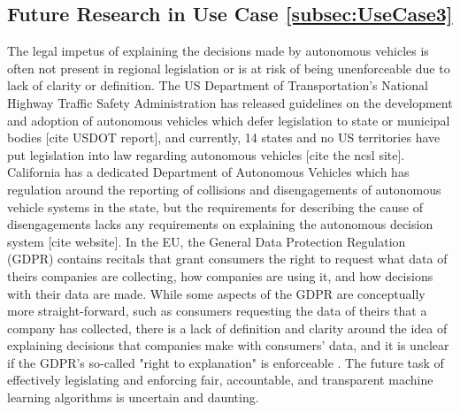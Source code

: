 \subsection{Future Research in Use Case \ref{subsec:UseCase3}}

The legal impetus of explaining the decisions made by autonomous vehicles is often not present in regional legislation or is at risk of being unenforceable due to lack of clarity or definition.  The US Department of Transportation's National Highway Traffic Safety Administration has released guidelines on the development and adoption of autonomous vehicles which defer legislation to state or municipal bodies [cite USDOT report], and currently, 14 states and no US territories have put legislation into law regarding autonomous vehicles [cite the ncsl site].  California has a dedicated Department of Autonomous Vehicles which has regulation around the reporting of collisions and disengagements of autonomous vehicle systems in the state, but the requirements for describing the cause of disengagements lacks any requirements on explaining the autonomous decision system [cite website].  In the EU, the General Data Protection Regulation (GDPR) contains recitals that grant consumers the right to request what data of theirs companies are collecting, how companies are using it, and how decisions with their data are made.  While some aspects of the GDPR are conceptually more straight-forward, such as consumers requesting the data of theirs that a company has collected, there is a lack of definition and clarity around the idea of explaining decisions that companies make with consumers' data, and it is unclear if the GDPR's so-called "right to explanation" is enforceable \cite{Mittelstadt2017}.  The future task of effectively legislating and enforcing fair, accountable, and transparent machine learning algorithms is uncertain and daunting.

